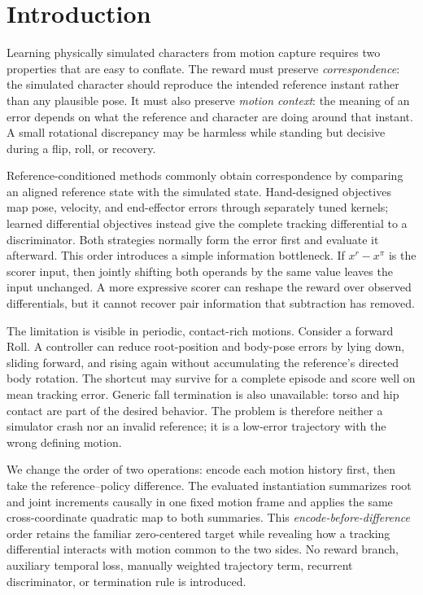 \section{Introduction}
\label{sec:introduction}

Learning physically simulated characters from motion capture requires two
properties that are easy to conflate.  The reward must preserve
\emph{correspondence}: the simulated character should reproduce the intended
reference instant rather than any plausible pose.  It must also preserve
\emph{motion context}: the meaning of an error depends on what the reference
and character are doing around that instant.  A small rotational discrepancy
may be harmless while standing but decisive during a flip, roll, or recovery.

Reference-conditioned methods commonly obtain correspondence by comparing an
aligned reference state with the simulated state.  Hand-designed objectives
map pose, velocity, and end-effector errors through separately tuned kernels;
learned differential objectives instead give the complete tracking
differential to a discriminator.  Both strategies normally form the error
first and evaluate it afterward.  This order introduces a simple information
bottleneck.  If $x^r-x^\pi$ is the scorer input, then jointly shifting both
operands by the same value leaves the input unchanged.  A more expressive
scorer can reshape the reward over observed differentials, but it cannot
recover pair information that subtraction has removed.

The limitation is visible in periodic, contact-rich motions.  Consider a
forward Roll.  A controller can reduce root-position and body-pose errors by
lying down, sliding forward, and rising again without accumulating the
reference's directed body rotation.  The shortcut may survive for a complete
episode and score well on mean tracking error.  Generic fall termination is
also unavailable: torso and hip contact are part of the desired behavior.
The problem is therefore neither a simulator crash nor an invalid reference;
it is a low-error trajectory with the wrong defining motion.

We change the order of two operations: encode each motion history first, then
take the reference--policy difference.  The evaluated instantiation summarizes
root and joint increments causally in one fixed motion frame and applies the
same cross-coordinate quadratic map to both summaries.  This
\emph{encode-before-difference} order retains the familiar zero-centered target
while revealing how a tracking differential interacts with motion common to
the two sides.  No reward branch, auxiliary temporal loss, manually weighted
trajectory term, recurrent discriminator, or termination rule is introduced.

